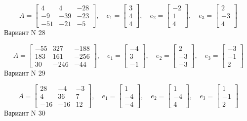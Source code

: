 \documentclass[11pt]{report}
\begin{document}
$$A = \left[\begin{matrix}4 & 4 & -28\\-9 & -39 & -23\\-51 & -21 & -5\end{matrix}\right],\quad e_1 = \left[\begin{matrix}3\\4\\4\end{matrix}\right],\quad e_2 = \left[\begin{matrix}-2\\1\\4\end{matrix}\right],\quad e_3 = \left[\begin{matrix}2\\-3\\4\end{matrix}\right]$$Вариант N 28

$$A = \left[\begin{matrix}-55 & 327 & -188\\183 & 161 & -256\\30 & -246 & -44\end{matrix}\right],\quad e_1 = \left[\begin{matrix}-4\\3\\-1\end{matrix}\right],\quad e_2 = \left[\begin{matrix}2\\-3\\-3\end{matrix}\right],\quad e_3 = \left[\begin{matrix}-3\\-1\\2\end{matrix}\right]$$Вариант N 29

$$A = \left[\begin{matrix}28 & -4 & -3\\4 & 36 & 7\\-16 & -16 & 12\end{matrix}\right],\quad e_1 = \left[\begin{matrix}1\\-4\\-4\end{matrix}\right],\quad e_2 = \left[\begin{matrix}1\\-4\\4\end{matrix}\right],\quad e_3 = \left[\begin{matrix}1\\-1\\2\end{matrix}\right]$$Вариант N 30
\end{document}
